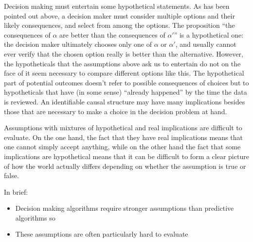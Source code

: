 Decision making must entertain some hypothetical statements. As has been pointed out above, a decision maker must consider multiple options and their likely consequences, and select from among the options. The proposition ``the consequences of $\alpha$ are better than the consequences of $\alpha'$'' is a hypothetical one: the decision maker ultimately chooses only one of $\alpha$ or $\alpha'$, and usually cannot ever verify that the chosen option really is better than the alternative. However, the hypotheticals that the assumptions above ask us to entertain do not on the face of it seem necessary to compare different options like this. The hypothetical part of potential outcomes doesn't refer to possible consequences of choices but to hypotheticals that have (in some sense) ``already happened'' by the time the data is reviewed. An identifiable causal structure may have many implications besides those that are necessary to make a choice in the decision problem at hand.

Assumptions with mixtures of hypothetical and real implications are difficult to evaluate. On the one hand, the fact that they have real implications means that one cannot simply accept anything, while on the other hand the fact that some implications are hypothetical means that it can be difficult to form a clear picture of how the world actually differs depending on whether the assumption is true or false.


In brief:
\begin{itemize}
    \item Decision making algorithms require stronger assumptions than predictive algorithms so
    \item These assumptions are often particularly hard to evaluate
\end{itemize} 

